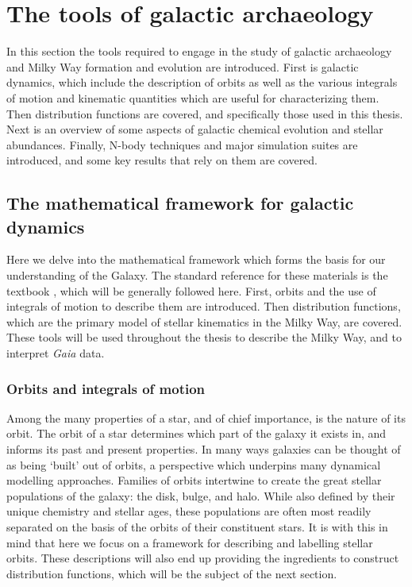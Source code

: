 \section{The tools of galactic archaeology}

In this section the tools required to engage in the study of galactic archaeology and Milky Way formation and evolution are introduced. First is galactic dynamics, which include the description of orbits as well as the various integrals of motion and kinematic quantities which are useful for characterizing them. Then distribution functions are covered, and specifically those used in this thesis. Next is an overview of some aspects of galactic chemical evolution and stellar abundances. Finally, N-body techniques and major simulation suites are introduced, and some key results that rely on them are covered. 

\subsection{The mathematical framework for galactic dynamics}

Here we delve into the mathematical framework which forms the basis for our understanding of the Galaxy. The standard reference for these materials is the textbook \textcite{binney08}, which will be generally followed here. First, orbits and the use of integrals of motion to describe them are introduced. Then distribution functions, which are the primary model of stellar kinematics in the Milky Way, are covered. These tools will be used throughout the thesis to describe the Milky Way, and to interpret \textit{Gaia} data.

\subsubsection{Orbits and integrals of motion}

Among the many properties of a star, and of chief importance, is the nature of its orbit. The orbit of a star determines which part of the galaxy it exists in, and informs its past and present properties. In many ways galaxies can be thought of as being `built' out of orbits, a perspective which underpins many dynamical modelling approaches. Families of orbits intertwine to create the great stellar populations of the galaxy: the disk, bulge, and halo. While also defined by their unique chemistry and stellar ages, these populations are often most readily separated on the basis of the orbits of their constituent stars. It is with this in mind that here we focus on a framework for describing and labelling stellar orbits. These descriptions will also end up providing the ingredients to construct distribution functions, which will be the subject of the next section.

